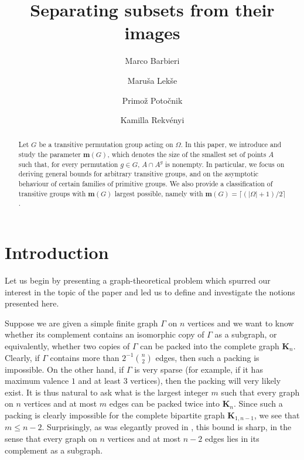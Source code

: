 \documentclass[a4paper]{amsart}
\title{Separating subsets from their images}
\author[M.~Barbieri]{Marco Barbieri}
\author[M.~Lekše ]{Maruša Lekše}
\author[P.~Potočnik]{Primož Potočnik}
\author[K.~Rekv\'enyi]{Kamilla Rekv\'enyi}
\newcommand{\m}{\mathbf{m}}
\newcommand{\K}{\mathbf{K}}
\theoremstyle{definition}
\begin{document}
\maketitle
\begin{abstract}
Let $G$ be a transitive permutation group acting on $\Omega$. In this paper, we introduce and study the parameter $\m(G)$, which denotes the size of the smallest set of points $A$ such that, for every  permutation $g\in G$, $A \cap A^g$ is nonempty. In particular, we focus on deriving general bounds for arbitrary transitive groups, and on the asymptotic behaviour of certain families of primitive groups. We also provide a classification of transitive groups with $\m(G)$ largest possible, namely with $\m(G)=\lceil (|\Omega|+1) / 2 \rceil$. 
\end{abstract}

\tableofcontents
	
\section{Introduction}\label{sec:intro}
Let us begin by presenting a graph-theoretical problem which spurred our interest in the topic of the paper and led us to define and investigate the notions presented here.

Suppose we are given a simple finite graph $\Gamma$ on $n$ vertices and we want to know whether its complement contains an isomorphic copy of $\Gamma$ as a subgraph, or equivalently, whether two copies of $\Gamma$ can be packed into the complete graph $\K_n$. Clearly, if $\Gamma$ contains more than $2^{-1} {n\choose 2}$ edges, then such a packing is impossible. On the other hand, if $\Gamma$ is very sparse (for example, if it has maximum valence $1$ and at least $3$ vertices), then the packing will very likely exist. It is thus natural to ask what is the largest integer $m$ such that every graph on $n$ vertices and at most $m$ edges can be packed twice into $\K_n$. Since such a packing is clearly impossible for the complete bipartite graph $\K_{1,n-1}$, we see that $m\le n-2$. Surprisingly, as was elegantly proved in \cite[Theorem 1]{BurnsSchuster1977}, this bound is sharp, in the sense that every graph on $n$ vertices and at most $n-2$ edges lies in its complement as a subgraph.

\end{document}

